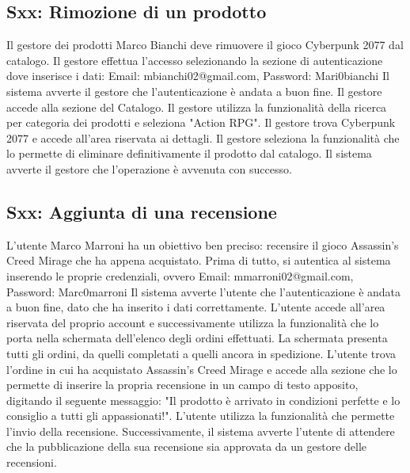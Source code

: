 \documentclass[12pt, a4paper, oneside]{book}
\begin{document}
    \subsection*{Sxx: Rimozione di un prodotto}
        Il gestore dei prodotti Marco Bianchi deve rimuovere il gioco Cyberpunk 2077 dal catalogo.
        Il gestore effettua l'accesso selezionando la sezione di autenticazione dove inserisce i dati: Email: mbianchi02@gmail.com, Password: Mari0bianchi
        Il sistema avverte il gestore che l'autenticazione è andata a buon fine. Il gestore accede alla sezione del Catalogo.
        Il gestore utilizza la funzionalità della ricerca per categoria dei prodotti e seleziona "Action RPG". Il gestore
        trova Cyberpunk 2077 e accede all'area riservata ai dettagli. Il gestore seleziona la funzionalità che lo
        permette di eliminare definitivamente il prodotto dal catalogo. Il sistema avverte il gestore che l'operazione è avvenuta con successo.

    \subsection*{Sxx: Aggiunta di una recensione}
        L'utente Marco Marroni ha un obiettivo ben preciso: recensire il gioco Assassin's Creed Mirage che ha appena acquistato.
        Prima di tutto, si autentica al sistema inserendo le proprie credenziali, ovvero Email: mmarroni02@gmail.com, Password: Marc0marroni
        Il sistema avverte l'utente che l'autenticazione è andata a buon fine, dato che ha inserito i dati correttamente.
        L'utente accede all'area riservata del proprio account e successivamente utilizza la funzionalità
        che lo porta nella schermata dell'elenco degli ordini effettuati. La schermata presenta tutti gli ordini,
        da quelli completati a quelli ancora in spedizione. L'utente trova l'ordine in cui ha acquistato
        Assassin's Creed Mirage e accede alla sezione che lo permette di inserire la propria recensione
        in un campo di testo apposito, digitando il seguente messaggio: "Il prodotto è arrivato in condizioni perfette
        e lo consiglio a tutti gli appassionati!". L'utente utilizza la funzionalità che permette l'invio della recensione.
        Successivamente, il sistema avverte l'utente di attendere che la pubblicazione della sua recensione sia approvata
        da un gestore delle recensioni.
\end{document}
